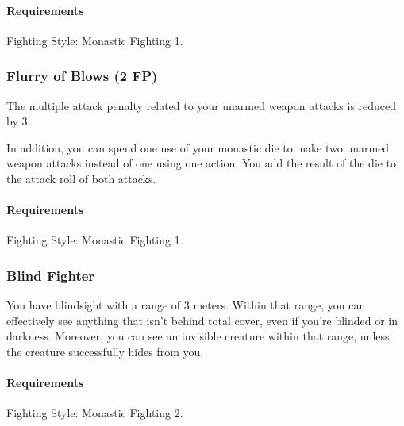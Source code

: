     \paragraph{Requirements} Fighting Style: Monastic Fighting 1.
\subsubsection{Flurry of Blows (2 FP)} \label{feat::flurryofblows}
    The multiple attack penalty related to your unarmed weapon attacks is reduced by 3.

    In addition, you can spend one use of your monastic die to make two unarmed weapon attacks instead of one using one action.
    You add the result of the die to the attack roll of both attacks.
    \paragraph{Requirements} Fighting Style: Monastic Fighting 1.
\subsubsection{Blind Fighter} \label{feat::blindfighter}
    You have blindsight with a range of 3 meters.
    Within that range, you can effectively see anything that isn't behind total cover, even if you're blinded or in darkness.
    Moreover, you can see an invisible creature within that range, unless the creature successfully hides from you.
    \paragraph{Requirements} Fighting Style: Monastic Fighting 2.
